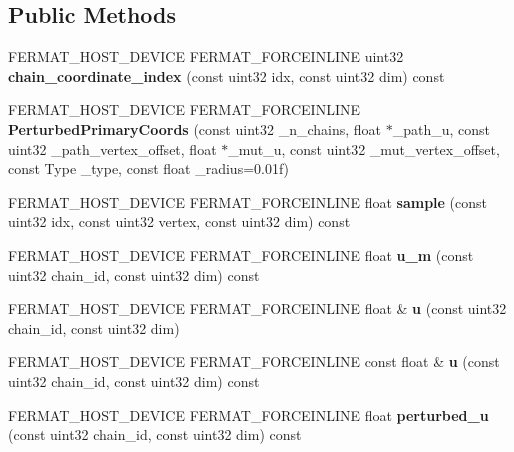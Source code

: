 \subsection*{Public Methods}
\begin{DoxyCompactItemize}
\item 
\mbox{\label{struct_perturbed_primary_coords_a922ff6ce8a957c076f402ef55c8d4810}} 
F\+E\+R\+M\+A\+T\+\_\+\+H\+O\+S\+T\+\_\+\+D\+E\+V\+I\+CE F\+E\+R\+M\+A\+T\+\_\+\+F\+O\+R\+C\+E\+I\+N\+L\+I\+NE uint32 {\bfseries chain\+\_\+coordinate\+\_\+index} (const uint32 idx, const uint32 dim) const
\item 
\mbox{\label{struct_perturbed_primary_coords_a59337b148ab94665bfb84eee02a3bd7d}} 
F\+E\+R\+M\+A\+T\+\_\+\+H\+O\+S\+T\+\_\+\+D\+E\+V\+I\+CE F\+E\+R\+M\+A\+T\+\_\+\+F\+O\+R\+C\+E\+I\+N\+L\+I\+NE {\bfseries Perturbed\+Primary\+Coords} (const uint32 \+\_\+n\+\_\+chains, float $\ast$\+\_\+path\+\_\+u, const uint32 \+\_\+path\+\_\+vertex\+\_\+offset, float $\ast$\+\_\+mut\+\_\+u, const uint32 \+\_\+mut\+\_\+vertex\+\_\+offset, const Type \+\_\+type, const float \+\_\+radius=0.\+01f)
\item 
\mbox{\label{struct_perturbed_primary_coords_af51dcfdfba46e5043deab4ad880721c7}} 
F\+E\+R\+M\+A\+T\+\_\+\+H\+O\+S\+T\+\_\+\+D\+E\+V\+I\+CE F\+E\+R\+M\+A\+T\+\_\+\+F\+O\+R\+C\+E\+I\+N\+L\+I\+NE float {\bfseries sample} (const uint32 idx, const uint32 vertex, const uint32 dim) const
\item 
\mbox{\label{struct_perturbed_primary_coords_a587274d5c8f87f0f406bed2f916908a7}} 
F\+E\+R\+M\+A\+T\+\_\+\+H\+O\+S\+T\+\_\+\+D\+E\+V\+I\+CE F\+E\+R\+M\+A\+T\+\_\+\+F\+O\+R\+C\+E\+I\+N\+L\+I\+NE float {\bfseries u\+\_\+m} (const uint32 chain\+\_\+id, const uint32 dim) const
\item 
\mbox{\label{struct_perturbed_primary_coords_a7020dd85fcb52ceb418d469a370fc1e8}} 
F\+E\+R\+M\+A\+T\+\_\+\+H\+O\+S\+T\+\_\+\+D\+E\+V\+I\+CE F\+E\+R\+M\+A\+T\+\_\+\+F\+O\+R\+C\+E\+I\+N\+L\+I\+NE float \& {\bfseries u} (const uint32 chain\+\_\+id, const uint32 dim)
\item 
\mbox{\label{struct_perturbed_primary_coords_a8ab27760f5ff92596d531c3ea41b880e}} 
F\+E\+R\+M\+A\+T\+\_\+\+H\+O\+S\+T\+\_\+\+D\+E\+V\+I\+CE F\+E\+R\+M\+A\+T\+\_\+\+F\+O\+R\+C\+E\+I\+N\+L\+I\+NE const float \& {\bfseries u} (const uint32 chain\+\_\+id, const uint32 dim) const
\item 
\mbox{\label{struct_perturbed_primary_coords_ab76cb15e84cbe45884b1ec26a33daeac}} 
F\+E\+R\+M\+A\+T\+\_\+\+H\+O\+S\+T\+\_\+\+D\+E\+V\+I\+CE F\+E\+R\+M\+A\+T\+\_\+\+F\+O\+R\+C\+E\+I\+N\+L\+I\+NE float {\bfseries perturbed\+\_\+u} (const uint32 chain\+\_\+id, const uint32 dim) const
\end{DoxyCompactItemize}
